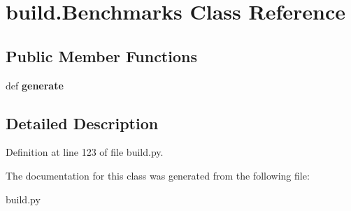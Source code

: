 \hypertarget{classbuild_1_1Benchmarks}{\section{build.\-Benchmarks \-Class \-Reference}
\label{classbuild_1_1Benchmarks}
}
\subsection*{\-Public \-Member \-Functions}
\begin{DoxyCompactItemize}
\item 
\hypertarget{classbuild_1_1Benchmarks_a90444b5ee86805be3194ec86e41ee0a9}{def {\bfseries generate}}\label{classbuild_1_1Benchmarks_a90444b5ee86805be3194ec86e41ee0a9}

\end{DoxyCompactItemize}


\subsection{\-Detailed \-Description}


\-Definition at line 123 of file build.\-py.



\-The documentation for this class was generated from the following file\-:\begin{DoxyCompactItemize}
\item 
build.\-py\end{DoxyCompactItemize}
